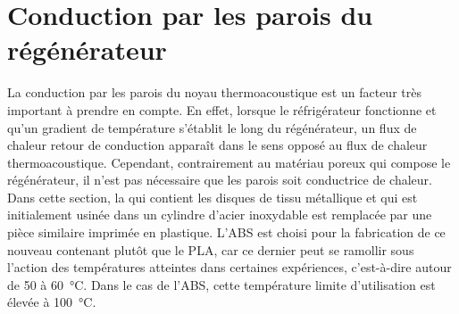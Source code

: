 \section{Conduction par les parois du régénérateur}
La conduction par les parois du noyau thermoacoustique est un facteur très important à prendre en compte. En effet, lorsque le réfrigérateur fonctionne et qu'un gradient de température s'établit le long du régénérateur, un flux de chaleur \og retour \fg{} de conduction apparaît dans le sens opposé au flux de chaleur thermoacoustique. Cependant, contrairement au matériau poreux qui compose le régénérateur, il n'est pas nécessaire que les parois soit conductrice de chaleur. Dans cette section, la  qui contient les disques de tissu métallique et qui est initialement usinée dans un cylindre d'acier inoxydable est remplacée par une pièce similaire imprimée en plastique. L'ABS est choisi pour la fabrication de ce nouveau contenant plutôt que le PLA, car ce dernier peut se ramollir sous l'action des températures atteintes dans certaines expériences, c'est-à-dire autour de \num{50} à \qty{60}{\degreeCelsius}. Dans le cas de l'ABS, cette température limite d'utilisation est élevée à \qty{100}{\degreeCelsius}.

